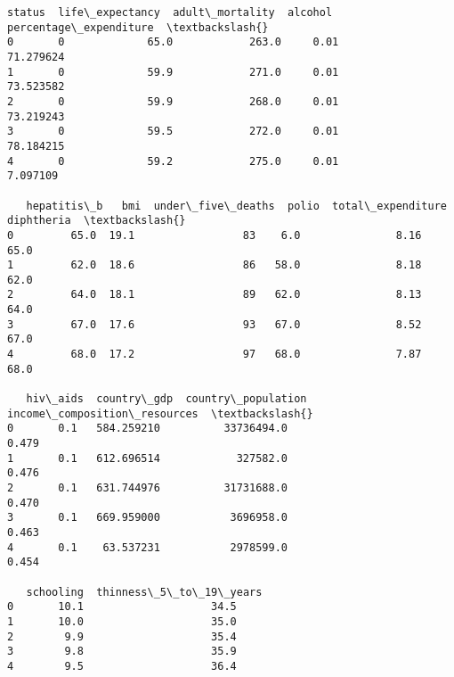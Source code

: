 \documentclass[11pt]{article}
\begin{document}
    \begin{Verbatim}[commandchars=\\\{\}]
   status  life\_expectancy  adult\_mortality  alcohol  percentage\_expenditure  \textbackslash{}
0       0             65.0            263.0     0.01               71.279624
1       0             59.9            271.0     0.01               73.523582
2       0             59.9            268.0     0.01               73.219243
3       0             59.5            272.0     0.01               78.184215
4       0             59.2            275.0     0.01                7.097109

   hepatitis\_b   bmi  under\_five\_deaths  polio  total\_expenditure  diphtheria  \textbackslash{}
0         65.0  19.1                 83    6.0               8.16        65.0
1         62.0  18.6                 86   58.0               8.18        62.0
2         64.0  18.1                 89   62.0               8.13        64.0
3         67.0  17.6                 93   67.0               8.52        67.0
4         68.0  17.2                 97   68.0               7.87        68.0

   hiv\_aids  country\_gdp  country\_population  income\_composition\_resources  \textbackslash{}
0       0.1   584.259210          33736494.0                         0.479
1       0.1   612.696514            327582.0                         0.476
2       0.1   631.744976          31731688.0                         0.470
3       0.1   669.959000           3696958.0                         0.463
4       0.1    63.537231           2978599.0                         0.454

   schooling  thinness\_5\_to\_19\_years
0       10.1                    34.5
1       10.0                    35.0
2        9.9                    35.4
3        9.8                    35.9
4        9.5                    36.4
    \end{Verbatim}
\end{document}
